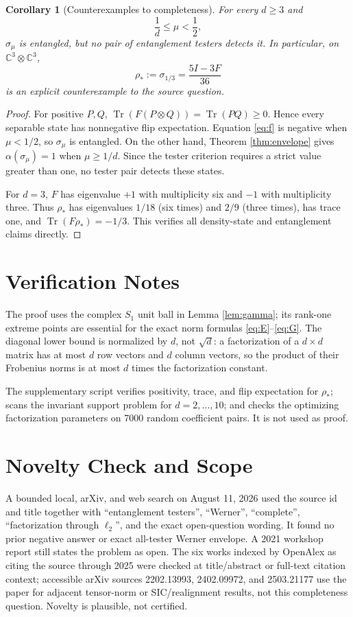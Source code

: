 \documentclass[11pt]{amsart}
\newtheorem{corollary}{Corollary}
\newcommand{\Tr}{\operatorname{Tr}}
\begin{document}
\begin{corollary}[Counterexamples to completeness]\label{cor:counterexample}
For every $d\geq3$ and
\[
 \frac1d\leq\mu<\frac12,
\]
$\sigma_\mu$ is entangled, but no pair of entanglement testers detects it.
In particular, on $\mathbb C^3\otimes\mathbb C^3$,
\[
 \rho_*:=\sigma_{1/3}=\frac{5I-3F}{36}
\]
is an explicit counterexample to the source question.
\end{corollary}

\begin{proof}
For positive $P,Q$, $\Tr(F(P\otimes Q))=\Tr(PQ)\geq0$.  Hence every
separable state has nonnegative flip expectation.  Equation \eqref{eq:f}
is negative when $\mu<1/2$, so $\sigma_\mu$ is entangled.  On the other hand,
Theorem \ref{thm:envelope} gives $\alpha(\sigma_\mu)=1$ when
$\mu\geq1/d$.  Since the tester criterion requires a strict value greater
than one, no tester pair detects these states.

For $d=3$, $F$ has eigenvalue $+1$ with multiplicity six and $-1$ with
multiplicity three.  Thus $\rho_*$ has eigenvalues $1/18$ (six times) and
$2/9$ (three times), has trace one, and
$\Tr(F\rho_*)=-1/3$.  This verifies all density-state and entanglement
claims directly.
\end{proof}

\section*{Verification Notes}

The proof uses the complex $S_1$ unit ball in Lemma \ref{lem:gamma}; its
rank-one extreme points are essential for the exact norm formulas
\eqref{eq:E}--\eqref{eq:G}.  The diagonal lower bound is normalized by $d$,
not $\sqrt d$: a factorization of a $d\times d$ matrix has at most $d$ row
vectors and $d$ column vectors, so the product of their Frobenius norms is at
most $d$ times the factorization constant.

The supplementary script verifies positivity, trace, and flip expectation
for $\rho_*$; scans the invariant support problem for $d=2,\ldots,10$; and
checks the optimizing factorization parameters on 7000 random coefficient
pairs.  It is not used as proof.

\section*{Novelty Check and Scope}

A bounded local, arXiv, and web search on August 11, 2026 used the source id
and title together with ``entanglement testers'', ``Werner'', ``complete'',
``factorization through $\ell_2$'', and the exact open-question wording.  It
found no prior negative answer or exact all-tester Werner envelope.  A 2021
workshop report still states the problem as open.  The six works indexed by
OpenAlex as citing the source through 2025 were checked at title/abstract or
full-text citation context; accessible arXiv sources 2202.13993, 2402.09972,
and 2503.21177 use the paper for adjacent tensor-norm or SIC/realignment
results, not this completeness question.  Novelty is plausible, not
certified.
\end{document}
